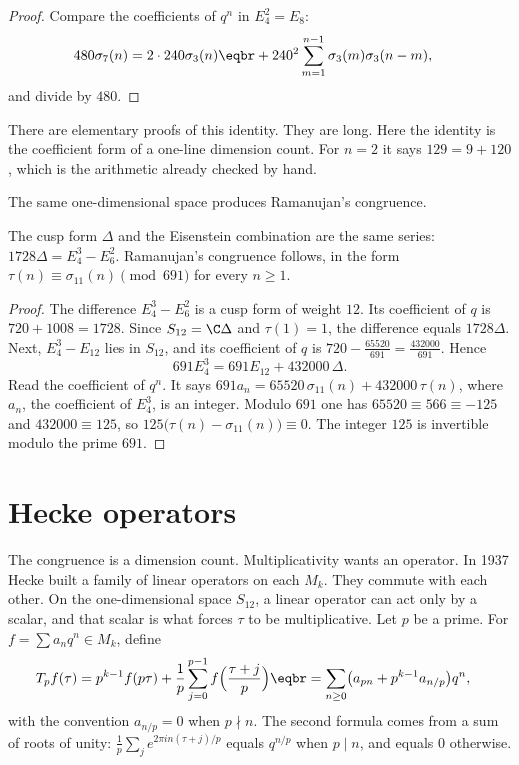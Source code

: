 \begin{proof}
Compare the coefficients of $q^n$ in $E_4^2=E_8$:
\[
\begin{aligned}480\sigma_7(n)&=2\cdot240\sigma_3(n)\eqbr+240^2\sum_{m=1}^{n-1}\sigma_3(m)\sigma_3(n-m),\end{aligned}
\]
and divide by $480$.
\end{proof}

There are elementary proofs of this identity. They are long. Here the identity is the coefficient form of a one-line dimension count. For $n=2$ it says $129=9+120$, which is the arithmetic already checked by hand.

The same one-dimensional space produces Ramanujan's congruence.

\begin{corollary}\label{cor:delta}
The cusp form $\Delta$ and the Eisenstein combination are the same series: $1728\Delta=E_4^3-E_6^2$. Ramanujan's congruence follows, in the form $\tau(n)\equiv\sigma_{11}(n)\pmod{691}$ for every $n\ge1$.
\end{corollary}

\begin{proof}
The difference $E_4^3-E_6^2$ is a cusp form of weight $12$. Its coefficient of $q$ is $720+1008=1728$. Since $S_{12}=\C\Delta$ and $\tau(1)=1$, the difference equals $1728\Delta$. Next, $E_4^3-E_{12}$ lies in $S_{12}$, and its coefficient of $q$ is $720-\frac{65520}{691}=\frac{432000}{691}$. Hence
\[
691E_4^3=691E_{12}+432000\,\Delta.
\]
Read the coefficient of $q^n$. It says $691a_n=65520\,\sigma_{11}(n)+432000\,\tau(n)$, where $a_n$, the coefficient of $E_4^3$, is an integer. Modulo $691$ one has $65520\equiv566\equiv-125$ and $432000\equiv125$, so $125\bigl(\tau(n)-\sigma_{11}(n)\bigr)\equiv0$. The integer $125$ is invertible modulo the prime $691$.
\end{proof}

\section{Hecke operators}

The congruence is a dimension count. Multiplicativity wants an operator. In 1937 Hecke built a family of linear operators on each $M_k$. They commute with each other. On the one-dimensional space $S_{12}$, a linear operator can act only by a scalar, and that scalar is what forces $\tau$ to be multiplicative. Let $p$ be a prime. For $f=\sum a_nq^n\in M_k$, define
\[
\begin{aligned}T_pf(\tau)&=p^{k-1}f(p\tau)+\frac1p\sum_{j=0}^{p-1}f\Bigl(\frac{\tau+j}p\Bigr)\eqbr=\sum_{n\ge0}\bigl(a_{pn}+p^{k-1}a_{n/p}\bigr)q^n,\end{aligned}
\]
with the convention $a_{n/p}=0$ when $p\nmid n$. The second formula comes from a sum of roots of unity: $\frac1p\sum_je^{2\pi in(\tau+j)/p}$ equals $q^{n/p}$ when $p\mid n$, and equals $0$ otherwise.

